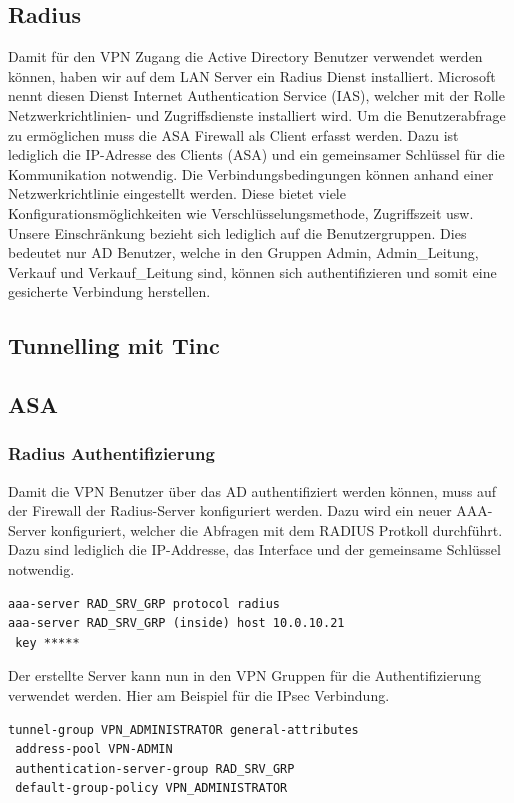 \documentclass[11pt,a4paper,parskip=half]{scrartcl}
\begin{document}
\subsection{Radius}
Damit für den VPN Zugang die Active Directory Benutzer verwendet werden können, haben wir auf dem LAN Server ein Radius Dienst installiert. Microsoft nennt diesen Dienst Internet Authentication Service (IAS), welcher mit der Rolle Netzwerkrichtlinien- und Zugriffsdienste installiert wird. Um die Benutzerabfrage zu ermöglichen muss die ASA Firewall als Client erfasst werden. Dazu ist lediglich die IP-Adresse des Clients (ASA) und ein gemeinsamer Schlüssel für die Kommunikation notwendig. Die Verbindungsbedingungen können anhand einer Netzwerkrichtlinie eingestellt werden. Diese bietet viele Konfigurationsmöglichkeiten wie Verschlüsselungsmethode, Zugriffszeit usw. Unsere Einschränkung bezieht sich lediglich auf
die Benutzergruppen. Dies bedeutet nur AD Benutzer, welche in den Gruppen Admin, Admin\_Leitung, Verkauf und Verkauf\_Leitung sind, können sich authentifizieren und somit eine gesicherte Verbindung herstellen.

\subsection{Tunnelling mit Tinc}


\subsection{ASA}
\subsubsection{Radius Authentifizierung}
Damit die VPN Benutzer über das AD authentifiziert werden können, muss auf der Firewall der Radius-Server konfiguriert werden. Dazu wird ein neuer AAA-Server konfiguriert, welcher die Abfragen mit dem RADIUS Protkoll durchführt. Dazu sind lediglich die IP-Addresse, das Interface und der gemeinsame Schlüssel notwendig.
\begin{lstlisting}
aaa-server RAD_SRV_GRP protocol radius
aaa-server RAD_SRV_GRP (inside) host 10.0.10.21
 key *****
\end{lstlisting}
Der erstellte Server kann nun in den VPN Gruppen für die Authentifizierung verwendet werden. Hier am Beispiel für die IPsec Verbindung.
\begin{lstlisting}
tunnel-group VPN_ADMINISTRATOR general-attributes
 address-pool VPN-ADMIN
 authentication-server-group RAD_SRV_GRP
 default-group-policy VPN_ADMINISTRATOR
\end{lstlisting}
\end{document}

